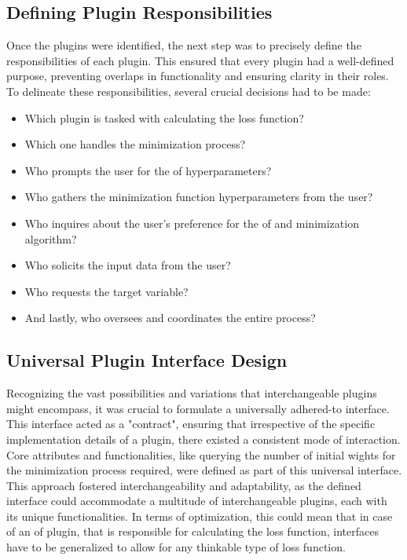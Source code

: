 \documentclass[
  a4paper,  %
  twoside,  %
  bibliography=totoc,
  headsepline,
  cleardoublepage=empty,
  parskip=half,
  draft=false
]{scrbook}
\begin{document}
\subsection{Defining Plugin Responsibilities}
Once the plugins were identified, the next step was to precisely define the responsibilities of each plugin.
This ensured that every plugin had a well-defined purpose, preventing overlaps in functionality and ensuring clarity in their roles.
To delineate these responsibilities, several crucial decisions had to be made:

\begin{itemize}
  \item Which plugin is tasked with calculating the loss function?
  \item Which one handles the minimization process?
  \item Who prompts the user for the \gls{of} hyperparameters?
  \item Who gathers the minimization function hyperparameters from the user?
  \item Who inquires about the user's preference for the \gls{of} and minimization algorithm?
  \item Who solicits the input data from the user?
  \item Who requests the target variable?
  \item And lastly, who oversees and coordinates the entire process?
\end{itemize}

\subsection{Universal Plugin Interface Design}
Recognizing the vast possibilities and variations that interchangeable plugins might encompass, it was crucial to formulate a universally adhered-to interface.
This interface acted as a "contract", ensuring that irrespective of the specific implementation details of a plugin, there existed a consistent mode of interaction.
Core attributes and functionalities, like querying the number of initial wights for the minimization process required, were defined as part of this universal interface.
This approach fostered interchangeability and adaptability, as the defined interface could accommodate a multitude of interchangeable plugins, each with its unique functionalities.
In terms of optimization, this could mean that in case of an \gls{of} plugin, that is responsible for calculating the loss function, interfaces have to be generalized to allow for any thinkable type of loss function.
\end{document}
